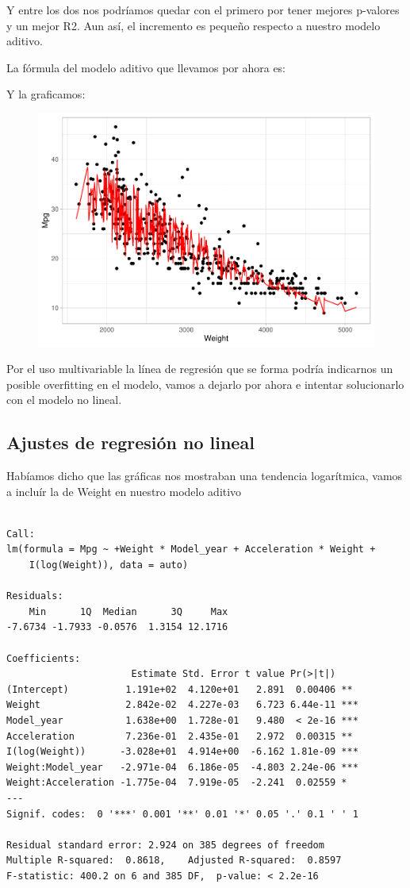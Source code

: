 Y entre los dos nos podríamos quedar con el primero por tener mejores p-valores y un mejor R2. Aun así, el incremento es pequeño respecto a nuestro modelo aditivo.

La fórmula del modelo aditivo que llevamos por ahora es:

Y la graficamos:

\begin{figure}[H]\includegraphics[width=.9\linewidth]{img/Regresion_files/figure-latex/unnamed-chunk-16-1} \caption{}\end{figure}

Por el uso multivariable la línea de regresión que se forma podría indicarnos un posible overfitting en el modelo, vamos a dejarlo por ahora e intentar solucionarlo con el modelo no lineal.

\subsection{Ajustes de regresión no lineal}

Habíamos dicho que las gráficas nos mostraban una tendencia logarítmica, vamos a incluír la de Weight en nuestro modelo aditivo

\begin{verbatim}

Call:
lm(formula = Mpg ~ +Weight * Model_year + Acceleration * Weight + 
    I(log(Weight)), data = auto)

Residuals:
    Min      1Q  Median      3Q     Max 
-7.6734 -1.7933 -0.0576  1.3154 12.1716 

Coefficients:
                      Estimate Std. Error t value Pr(>|t|)    
(Intercept)          1.191e+02  4.120e+01   2.891  0.00406 ** 
Weight               2.842e-02  4.227e-03   6.723 6.44e-11 ***
Model_year           1.638e+00  1.728e-01   9.480  < 2e-16 ***
Acceleration         7.236e-01  2.435e-01   2.972  0.00315 ** 
I(log(Weight))      -3.028e+01  4.914e+00  -6.162 1.81e-09 ***
Weight:Model_year   -2.971e-04  6.186e-05  -4.803 2.24e-06 ***
Weight:Acceleration -1.775e-04  7.919e-05  -2.241  0.02559 *  
---
Signif. codes:  0 '***' 0.001 '**' 0.01 '*' 0.05 '.' 0.1 ' ' 1

Residual standard error: 2.924 on 385 degrees of freedom
Multiple R-squared:  0.8618,    Adjusted R-squared:  0.8597 
F-statistic: 400.2 on 6 and 385 DF,  p-value: < 2.2e-16
\end{verbatim}

